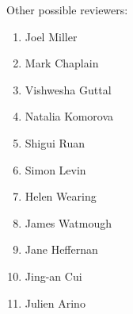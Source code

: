 \documentclass[11pt,a4paper,roman]{moderncv}
\begin{document}
Other possible reviewers:
\begin{enumerate}
\item Joel Miller
\item Mark Chaplain
\item Vishwesha Guttal
\item Natalia Komorova
\item Shigui Ruan
\item Simon Levin

\item Helen Wearing
\item James Watmough
\item Jane Heffernan
\item Jing-an Cui
\item Julien Arino

\end{enumerate} 
\end{document}
